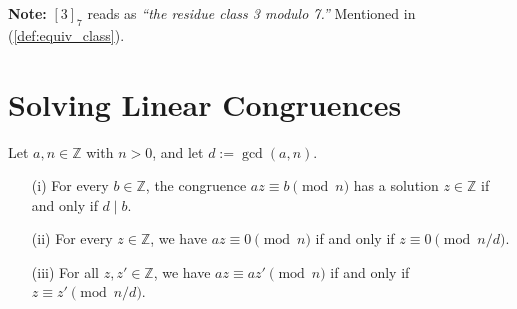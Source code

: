 \begin{Note}
    \textbf{Note:} $[3]_{7}$ reads as \textit{``the residue class 3 modulo 7.''} Mentioned in (\ref{def:equiv_class}).
\end{Note}

\newpage

\section{Solving Linear Congruences}

\begin{theo}
Let \(a, n \in \mathbb{Z}\) with \(n > 0\), and let \(d := \gcd(a, n)\).
\begin{itemize}
    \item[(i)] For every \(b \in \mathbb{Z}\), the congruence \(az \equiv b \pmod{n}\) has a solution \(z \in \mathbb{Z}\) if and only if \(d \mid b\).
    
    \item[(ii)] For every \(z \in \mathbb{Z}\), we have \(az \equiv 0 \pmod{n}\) if and only if \(z \equiv 0 \pmod{n/d}\).
    
    \item[(iii)] For all \(z, z' \in \mathbb{Z}\), we have \(az \equiv az' \pmod{n}\) if and only if \(z \equiv z' \pmod{n/d}\).
\end{itemize}
\end{theo}
